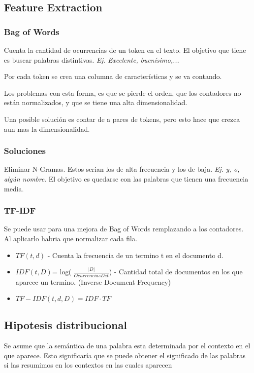 \documentclass[titlepage,a4paper]{article}
\begin{document}
\subsection{Feature Extraction}
\subsubsection*{Bag of Words}
Cuenta la cantidad de ocurrencias de un token en el texto. El objetivo que tiene es buscar palabras distintivas. \textit{Ej. Excelente, buenísimo,...}

Por cada token se crea una columna de características y se va contando.

Los problemas con esta forma, es que se pierde el orden, que los contadores no están normalizados, y que se tiene una alta dimensionalidad.

Una posible solución es contar de a pares de tokens, pero esto hace que crezca aun mas la dimensionalidad.

\subsubsection*{Soluciones}
Eliminar N-Gramas. Estos serian los de alta frecuencia y los de baja. \textit{Ej. y, o, algún nombre}. El objetivo es quedarse con las palabras que tienen una frecuencia media.


\subsubsection*{TF-IDF}
Se puede usar para una mejora de Bag of Words remplazando a los contadores. Al aplicarlo habria que normalizar cada fila.
\begin{itemize}
\item $TF(t,d)$ - Cuenta la frecuencia de un termino t en el documento d.
\item $IDF(t,D)$= log( $\frac{|D|}{Ocurrencias De t} $) - Cantidad total de documentos en los que aparece un termino. (Inverse Document Frequency)
\item $TF-IDF(t,d,D) = IDF \cdot TF$
\end{itemize}


\subsection{Hipotesis distribucional}
Se asume que la semántica de una palabra esta determinada por el contexto en el que aparece. Esto significaría que se puede obtener el significado de las palabras si las resumimos en los contextos en las cuales aparecen
\end{document}
